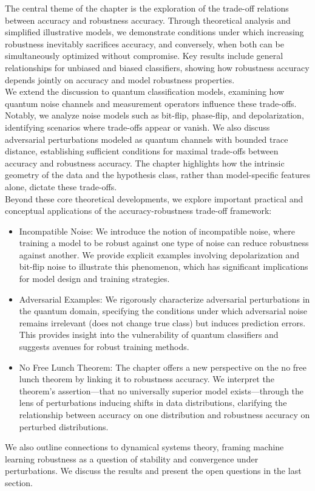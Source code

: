 \documentclass[onecolumn,prx, superscriptaddress,longbibliography,margin=1mm 11pt]{revtex4-2}
\begin{document}
The central theme of the chapter is the exploration of the trade-off relations between accuracy and robustness accuracy. Through theoretical analysis and simplified illustrative models, we demonstrate conditions under which increasing robustness inevitably sacrifices accuracy, and conversely, when both can be simultaneously optimized without compromise. Key results include general relationships for unbiased and biased classifiers, showing how robustness accuracy depends jointly on accuracy and model robustness properties.\\

We extend the discussion to quantum classification models, examining how quantum noise channels and measurement operators influence these trade-offs. Notably, we analyze noise models such as bit-flip, phase-flip, and depolarization, identifying scenarios where trade-offs appear or vanish. We also discuss adversarial perturbations modeled as quantum channels with bounded trace distance, establishing sufficient conditions for maximal trade-offs between accuracy and robustness accuracy. The chapter highlights how the intrinsic geometry of the data and the hypothesis class, rather than model-specific features alone, dictate these trade-offs.\\

Beyond these core theoretical developments, we explore important practical and conceptual applications of the accuracy-robustness trade-off framework:
\begin{itemize}
    \item Incompatible Noise: We introduce the notion of incompatible noise, where training a model to be robust against one type of noise can reduce robustness against another. We provide explicit examples involving depolarization and bit-flip noise to illustrate this phenomenon, which has significant implications for model design and training strategies.
\item	Adversarial Examples: We rigorously characterize adversarial perturbations in the quantum domain, specifying the conditions under which adversarial noise remains irrelevant (does not change true class) but induces prediction errors. This provides insight into the vulnerability of quantum classifiers and suggests avenues for robust training methods.
\item	No Free Lunch Theorem: The chapter offers a new perspective on the no free lunch theorem by linking it to robustness accuracy. We interpret the theorem’s assertion—that no universally superior model exists—through the lens of perturbations inducing shifts in data distributions, clarifying the relationship between accuracy on one distribution and robustness accuracy on perturbed distributions.
\end{itemize}
We also outline connections to dynamical systems theory, framing machine learning robustness as a question of stability and convergence under perturbations. We discuss the results and present the open questions in the last section. 
\end{document}
